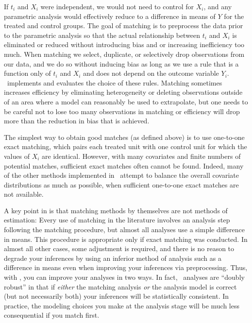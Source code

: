 If $t_i$ and $X_i$ were independent, we would not need to control for
$X_i$, and any parametric analysis would effectively reduce to a
difference in means of $Y$ for the treated and control groups.  The
goal of matching is to preprocess the data prior to the parametric
analysis so that the actual relationship between $t_i$ and $X_i$ is
eliminated or reduced without introducing bias and or increasing
inefficiency too much.  When matching we select, duplicate, or
selectively drop observations from our data, and we do so without
inducing bias as long as we use a rule that is a function only of
$t_i$ and $X_i$ and does not depend on the outcome variable $Y_i$.
\MatchIt\ implements and evaluates the choice of these rules.
Matching sometimes increases efficiency by eliminating heterogeneity
or deleting observations outside of an area where a model can
reasonably be used to extrapolate, but one needs to be careful not to
lose too many observations in matching or efficiency will drop more
than the reduction in bias that is achieved.

The simplest way to obtain good matches (as defined above) is to use
one-to-one exact matching, which pairs each treated unit with one
control unit for which the values of $X_i$ are identical.  However,
with many covariates and finite numbers of potential matches, 
sufficient exact matches often cannot be found.  Indeed, many of the
other methods implemented in \MatchIt\ attempt to balance the overall
covariate distributions as much as possible, when sufficient
one-to-one exact matches are not available.

A key point in \citet*{HoImaKin07} is that matching methods by
themselves are not methods of estimation: Every use of matching in the
literature involves an analysis step following the matching procedure,
but almost all analyses use a simple difference in means.  This
procedure is appropriate only if exact matching was conducted.  In
almost all other cases, some adjustment is required, and there is no
reason to degrade your inferences by using an inferior method of
analysis such as a difference in means even when improving your
inferences via preprocessing.  Thus, with \MatchIt, you can improve
your analyses in two ways.  In fact, \MatchIt\ analyses are ``doubly
robust'' in that if \emph{either} the matching analysis \emph{or} the
analysis model is correct (but not necessarily both) your inferences
will be statistically consistent.  In practice, the modeling choices
you make at the analysis stage will be much less consequential if you
match first.

